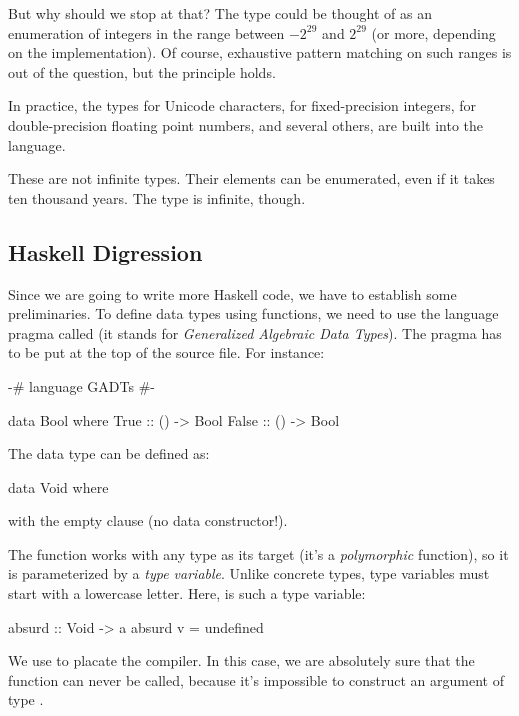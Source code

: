 \documentclass[DaoFP]{subfiles}
\begin{document}
But why should we stop at that? The type  could be thought of as an enumeration of integers in the range between $-2^{29}$ and $2^{29}$ (or more, depending on the implementation). Of course, exhaustive pattern matching on such ranges is out of the question, but the principle holds. 

In practice, the types  for Unicode characters,  for fixed-precision integers,  for double-precision floating point numbers, and several others, are built into the language.

These are not infinite types. Their elements can be enumerated, even if it takes ten thousand years. The type  is infinite, though.

\subsection{Haskell Digression}

Since we are going to write more Haskell code, we have to establish some preliminaries. To define data types using functions, we need to use the language pragma called  (it stands for \emph{Generalized Algebraic Data Types}). The pragma has to be put at the top of the source file. For instance:

\begin{haskell}
{-# language GADTs #-}

data Bool where
  True  :: () -> Bool
  False :: () -> Bool
\end{haskell}

The  data type can be defined as:
\begin{haskell}
data Void where
\end{haskell}
with the empty  clause (no data constructor!).

The function  works with any type as its target (it's a \emph{polymorphic} function), so it is parameterized by a \emph{type variable}. Unlike concrete types, type variables must start with a lowercase letter. Here,  is such a type variable:

\begin{haskell}
absurd :: Void -> a
absurd v = undefined
\end{haskell}
We use  to placate the compiler. In this case, we are absolutely sure that the function  can never be called, because it's impossible to construct an argument of type .
\end{document}

